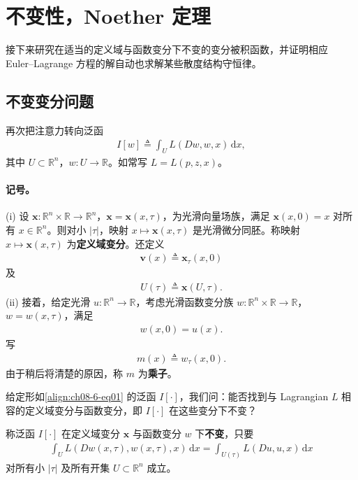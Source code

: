 \documentclass[../../main.tex]{subfiles}
\begin{document}
\section{不变性，Noether 定理}\label{section:ch08-6-不变性Noether}

接下来研究在适当的定义域与函数变分下不变的变分被积函数，并证明相应 Euler--Lagrange 方程的解自动也求解某些散度结构守恒律。

\subsection{不变变分问题}\label{subsection:ch08-6-1-不变变分问题}

再次把注意力转向泛函
\begin{align}
I[w]\triangleq\int_U L(Dw,w,x)\,\mathrm{d}x,\label{align:ch08-6-eq01}
\end{align}
其中 $U\subset\mathbb{R}^n$，$w:U\to\mathbb{R}$。如常写 $L=L(p,z,x)$。

\paragraph{记号。}
(i) 设 $\mathbf{x}:\mathbb{R}^n\times\mathbb{R}\to\mathbb{R}^n$，$\mathbf{x}=\mathbf{x}(x,\tau)$，为光滑向量场族，满足 $\mathbf{x}(x,0)=x$ 对所有 $x\in\mathbb{R}^n$。则对小 $|\tau|$，映射 $x\mapsto\mathbf{x}(x,\tau)$ 是光滑微分同胚。称映射 $x\mapsto\mathbf{x}(x,\tau)$ 为\textbf{定义域变分}。还定义
\begin{align}
\mathbf{v}(x)\triangleq\mathbf{x}_\tau(x,0)\label{align:ch08-6-eq02}
\end{align}
及
\begin{align}
U(\tau)\triangleq\mathbf{x}(U,\tau).\label{align:ch08-6-eq03}
\end{align}
(ii) 接着，给定光滑 $u:\mathbb{R}^n\to\mathbb{R}$，考虑光滑函数变分族 $w:\mathbb{R}^n\times\mathbb{R}\to\mathbb{R}$，$w=w(x,\tau)$，满足
\begin{align}
w(x,0)=u(x).\label{align:ch08-6-eq04}
\end{align}
写
\begin{align}
m(x)\triangleq w_\tau(x,0).\label{align:ch08-6-eq05}
\end{align}
由于稍后将清楚的原因，称 $m$ 为\textbf{乘子}。

给定形如\eqref{align:ch08-6-eq01} 的泛函 $I[\cdot]$，我们问：能否找到与 Lagrangian $L$ 相容的定义域变分与函数变分，即 $I[\cdot]$ 在这些变分下不变？

\begin{definition}\label{definition:ch08-6-不变}
称泛函 $I[\cdot]$ 在定义域变分 $\mathbf{x}$ 与函数变分 $w$ 下\textbf{不变}，只要
\begin{align}
\int_U L(Dw(x,\tau),w(x,\tau),x)\,\mathrm{d}x=\int_{U(\tau)}L(Du,u,x)\,\mathrm{d}x\label{align:ch08-6-eq06}
\end{align}
对所有小 $|\tau|$ 及所有开集 $U\subset\mathbb{R}^n$ 成立。
\end{definition}
\end{document}
